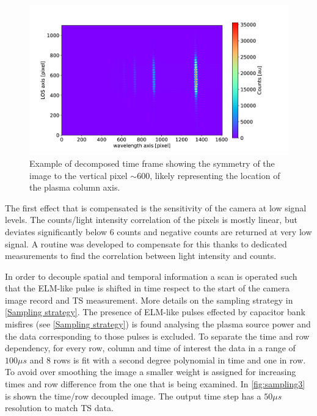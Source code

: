 \begin{figure}
	\centering
	\includegraphics[width=0.7\linewidth,trim={100 30 290 200},clip]{Chapters/chapter3/figs/sample_oes2.png}
	\caption{Example of decomposed time frame showing the symmetry of the image to the vertical pixel $\sim$600, likely representing the location of the plasma column axis.}
	\label{fig:sampling3}
\end{figure}

The first effect that is compensated is the sensitivity of the camera at low signal levels. The counts/light intensity correlation of the pixels is mostly linear, but deviates significantly below 6 counts and negative counts are returned at very low signal. A routine was developed to compensate for this thanks to dedicated measurements to find the correlation between light intensity and counts.

In order to decouple spatial and temporal information a scan is operated such that the ELM-like pulse is shifted in time respect to the start of the camera image record and TS measurement. More details on the sampling strategy in \autoref{Sampling strategy}. The presence of ELM-like pulses effected by capacitor bank misfires (see \autoref{Sampling strategy}) is found analysing the plasma source power and the data corresponding to those pulses is excluded. To separate the time and row dependency, for every row, column and time of interest the data in a range of $100\mu s$ and 8 rows is fit with a second degree polynomial in time and one in row. To avoid over smoothing the image a smaller weight is assigned for increasing times and row difference from the one that is being examined. In \autoref{fig:sampling3} is shown the time/row decoupled image. The output time step has a $50\mu s$ resolution to match TS data.

